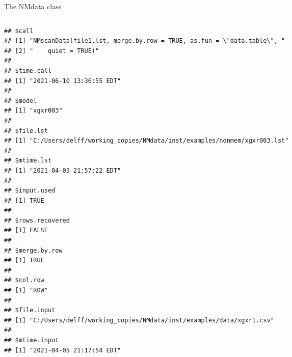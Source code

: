 \documentclass[
  8pt,
  ignorenonframetext,
  aspectratio=169]{beamer}
\begin{document}
\begin{frame}[fragile]{The NMdata class}
\begin{columns}[T]
\begin{column}{0.48\textwidth}
\begin{verbatim}
## $call
## [1] "NMscanData(file1.lst, merge.by.row = TRUE, as.fun = \"data.table\", "
## [2] "    quiet = TRUE)"                                                   
## 
## $time.call
## [1] "2021-06-10 13:36:55 EDT"
## 
## $model
## [1] "xgxr003"
## 
## $file.lst
## [1] "C:/Users/delff/working_copies/NMdata/inst/examples/nonmem/xgxr003.lst"
## 
## $mtime.lst
## [1] "2021-04-05 21:57:22 EDT"
## 
## $input.used
## [1] TRUE
## 
## $rows.recovered
## [1] FALSE
## 
## $merge.by.row
## [1] TRUE
## 
## $col.row
## [1] "ROW"
## 
## $file.input
## [1] "C:/Users/delff/working_copies/NMdata/inst/examples/data/xgxr1.csv"
## 
## $mtime.input
## [1] "2021-04-05 21:17:54 EDT"
\end{verbatim}
\end{column}
\end{columns}
\end{frame}
\end{document}
